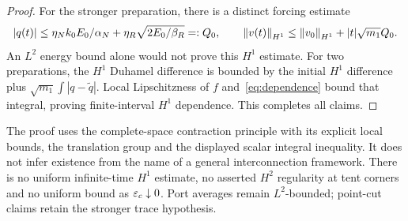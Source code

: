 \begin{proof}
For the stronger preparation, there is a distinct forcing estimate
\begin{equation}\label{eq:forcingbound}
 |q(t)|\le\eta_N k_0E_0/\alpha_N
       +\eta_R\sqrt{2E_0/\beta_R}=:Q_0,
 \qquad
 \left\|v(t)\right\|_{H^1}\le\left\|v_0\right\|_{H^1}+|t|\sqrt{m_1}Q_0.
\end{equation}
An $L^2$ energy bound alone would not prove this $H^1$ estimate. For two preparations, the $H^1$ Duhamel difference is bounded by the initial $H^1$ difference plus $\sqrt{m_1}\int|q-\widetilde q|$. Local Lipschitzness of $f$ and~\eqref{eq:dependence} bound that integral, proving finite-interval $H^1$ dependence. This completes all claims.
\end{proof}

The proof uses the complete-space contraction principle with its explicit local bounds, the translation group and the displayed scalar integral inequality. It does not infer existence from the name of a general interconnection framework. There is no uniform infinite-time $H^1$ estimate, no asserted $H^2$ regularity at tent corners and no uniform bound as $\varepsilon_c\downarrow0$. Port averages remain $L^2$-bounded; point-cut claims retain the stronger trace hypothesis.
